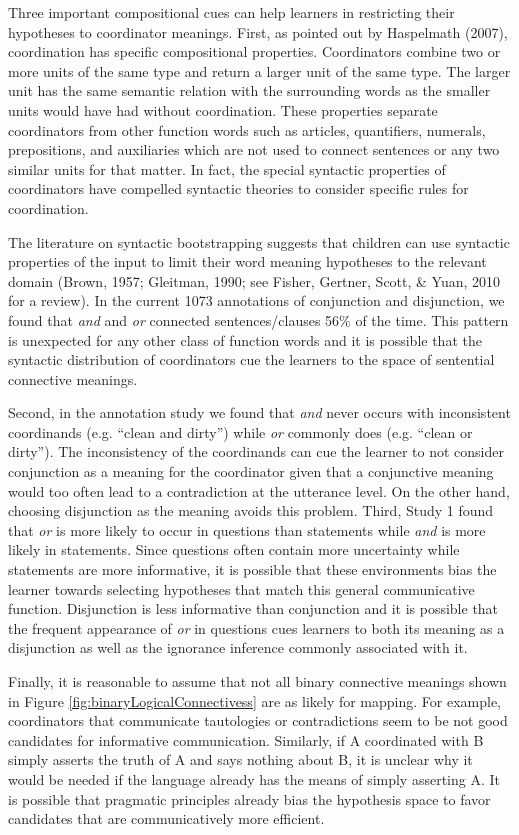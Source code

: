 \documentclass[,man,floatsintext]{apa6}
\begin{document}
Three important compositional cues can help learners in restricting their hypotheses to coordinator meanings. First, as pointed out by Haspelmath (2007), coordination has specific compositional properties. Coordinators combine two or more units of the same type and return a larger unit of the same type. The larger unit has the same semantic relation with the surrounding words as the smaller units would have had without coordination. These properties separate coordinators from other function words such as articles, quantifiers, numerals, prepositions, and auxiliaries which are not used to connect sentences or any two similar units for that matter. In fact, the special syntactic properties of coordinators have compelled syntactic theories to consider specific rules for coordination.

The literature on syntactic bootstrapping suggests that children can use syntactic properties of the input to limit their word meaning hypotheses to the relevant domain (Brown, 1957; Gleitman, 1990; see Fisher, Gertner, Scott, \& Yuan, 2010 for a review). In the current 1073 annotations of conjunction and disjunction, we found that \emph{and} and \emph{or} connected sentences/clauses 56\% of the time. This pattern is unexpected for any other class of function words and it is possible that the syntactic distribution of coordinators cue the learners to the space of sentential connective meanings.

Second, in the annotation study we found that \emph{and} never occurs with inconsistent coordinands (e.g. \enquote{clean and dirty}) while \emph{or} commonly does (e.g. \enquote{clean or dirty}). The inconsistency of the coordinands can cue the learner to not consider conjunction as a meaning for the coordinator given that a conjunctive meaning would too often lead to a contradiction at the utterance level. On the other hand, choosing disjunction as the meaning avoids this problem. Third, Study 1 found that \emph{or} is more likely to occur in questions than statements while \emph{and} is more likely in statements. Since questions often contain more uncertainty while statements are more informative, it is possible that these environments bias the learner towards selecting hypotheses that match this general communicative function. Disjunction is less informative than conjunction and it is possible that the frequent appearance of \emph{or} in questions cues learners to both its meaning as a disjunction as well as the ignorance inference commonly associated with it.

Finally, it is reasonable to assume that not all binary connective meanings shown in Figure \ref{fig:binaryLogicalConnectivess} are as likely for mapping. For example, coordinators that communicate tautologies or contradictions seem to be not good candidates for informative communication. Similarly, if A coordinated with B simply asserts the truth of A and says nothing about B, it is unclear why it would be needed if the language already has the means of simply asserting A. It is possible that pragmatic principles already bias the hypothesis space to favor candidates that are communicatively more efficient.
\end{document}
